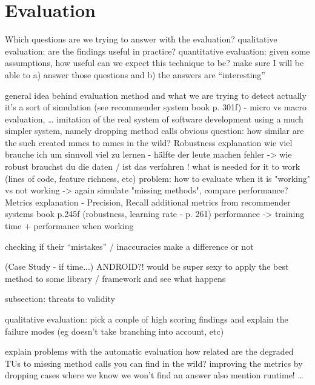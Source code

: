 \chapter{Evaluation}
Which questions are we trying to answer with the evaluation?
    qualitative evaluation: are the findings useful in practice?
    quantitative evaluation: given some assumptions, how useful can we expect this technique to be?
    make sure I will be able to a) answer those questions and b) the answers are ``interesting''

general idea behind evaluation method and what we are trying to detect
actually it's a sort of simulation (see recommender system book p. 301f) - micro vs macro evaluation, \ldots
    imitation of the real system of software development
    using a much simpler system, namely dropping method calls
    obvious question: how similar are the such created mmcs to mmcs in the wild?
Robustness explanation
    wie viel brauche ich um sinnvoll viel zu lernen - hälfte der leute machen fehler -> wie robust brauchst du die daten / ist das verfahren !
    what is needed for it to work (lines of code, feature richness, etc) 
    problem: how to evaluate when it is "working" vs not working -> again simulate "missing methods", compare performance?
Metrics explanation - Precision, Recall
    additional metrics from recommender systems book p.245f (robustness, learning rate - p. 261)
    performance -> training time + performance when working


checking if their ``mistakes'' / inaccuracies make a difference or not

(Case Study - if time...)
    ANDROID?!
    would be super sexy to apply the best method to some library / framework and see what happens

subsection: threats to validity

qualitative evaluation:
    pick a couple of high scoring findings and explain the failure modes (eg doesn't take branching into account, etc)

explain problems with the automatic evaluation
    how related are the degraded TUs to missing method calls you can find in the wild?
    improving the metrics by dropping cases where we know we won't find an answer
    also mention runtime!
    \ldots
